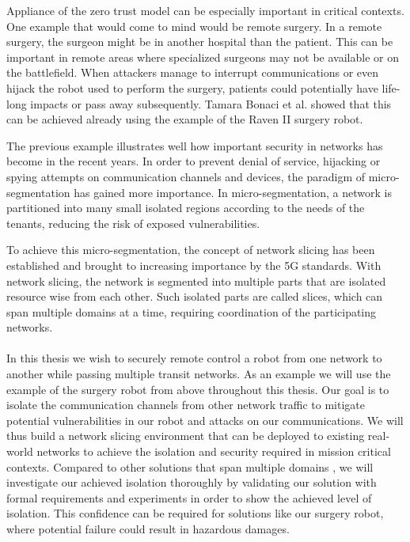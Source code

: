 Appliance of the zero trust model can be especially important in critical contexts. One example that would come to mind would be remote surgery. In a remote surgery, the surgeon might be in another hospital than the patient. This can be important in remote areas where specialized surgeons may not be available or on the battlefield. When attackers manage to interrupt communications or even hijack the robot used to perform the surgery, patients could potentially have life-long impacts or pass away subsequently. Tamara Bonaci et al. \cite{remotesurgeryhijacking} showed that this can be achieved already using the example of the Raven II surgery robot.

The previous example illustrates well how important security in networks has become in the recent years. In order to prevent denial of service, hijacking or spying attempts on communication channels and devices, the paradigm of micro-segmentation \cite{zerotrust} has gained more importance. In micro-segmentation, a network is partitioned into many small isolated regions according to the needs of the tenants, reducing the risk of exposed vulnerabilities.

To achieve this micro-segmentation, the concept of network slicing \cite{slicing} has been established and brought to increasing importance by the 5G standards. With network slicing, the network is segmented into multiple parts that are isolated resource wise from each other. Such isolated parts are called slices, which can span multiple domains at a time, requiring coordination of the participating networks.

\paragraph{} In this thesis we wish to securely remote control a robot from one network to another while passing multiple transit networks. As an example we will use the example of the surgery robot from above throughout this thesis. Our goal is to isolate the communication channels from other network traffic to mitigate potential vulnerabilities in our robot and attacks on our communications. We will thus build a network slicing environment that can be deployed to existing real-world networks to achieve the isolation and security required in mission critical contexts. Compared to other solutions that span multiple domains \cite{MD1,MD2,MD3,MD4,MD5}, we will investigate our achieved isolation thoroughly by validating our solution with formal requirements and experiments in order to show the achieved level of isolation. This confidence can be required for solutions like our surgery robot, where potential failure could result in hazardous damages.

